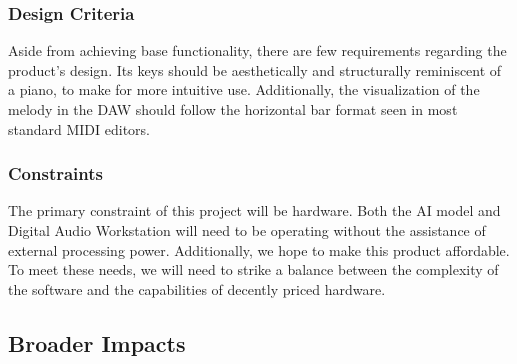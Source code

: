 \subsubsection{Design Criteria}

Aside from achieving base functionality, there are few requirements regarding the
product’s design. Its keys should be aesthetically and structurally reminiscent of a
piano, to make for more intuitive use. Additionally, the visualization of the melody in
the DAW should follow the horizontal bar format seen in most standard MIDI editors.

\subsubsection{Constraints}

The primary constraint of this project will be hardware. Both the AI model and Digital
Audio Workstation will need to be operating without the assistance of external
processing power. Additionally, we hope to make this product affordable. To meet
these needs, we will need to strike a balance between the complexity of the software
and the capabilities of decently priced hardware.



\subsection{Broader Impacts}

